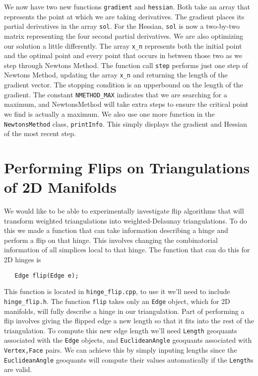 \documentclass{amsart}
\theoremstyle{plain}
\numberwithin{equation}{section}
\begin{document}
\bigskip

We now have two new functions \verb|gradient| and \verb|hessian|. Both take an array that represents the point at which we are taking derivatives. The gradient places its partial derivatives in the array \verb|sol|. For the Hessian, \verb|sol| is now a two-by-two matrix representing the four second partial derivatives. We are also optimizing our solution a little differently. The array \verb|x_n| represents both the initial point and the optimal point and every point that occurs in between those two as we step through Newtons Method. The function call \verb|step| performs just one step of Newtons Method, updating the array \verb|x_n| and returning the length of the gradient vector. The stopping condition is an upperbound on the length of the gradient. The constant \verb|NMETHOD_MAX| indicates that we are searching for a maximum, and NewtonsMethod will take extra steps to ensure the critical point we find is actually a maximum. We also use one more function in the \verb|NewtonsMethod| class, \verb|printInfo|. This simply displays the gradient and Hessian of the most recent step.\\

\section*{Performing Flips on Triangulations of 2D Manifolds}

We would like to be able to experimentally investigate flip algorithms that will transform weighted triangulations into weighted-Delaunay triangulations. To do this we made a function that can take information describing a hinge and perform a flip on that hinge. This involves changing the combinatorial information of all simplices local to that hinge. The function that can do this for 2D hinges is\\

\begin{verbatim}
   Edge flip(Edge e);
\end{verbatim}

\bigskip

This function is located in \verb|hinge_flip.cpp|, to use it we'll need to include \verb|hinge_flip.h|. The function \verb|flip| takes only an \verb|Edge| object, which for 2D manifolds, will fully describe a hinge in our triangulation. Part of performing a flip involves giving the flipped edge a new length so that it fits into the rest of the triangulation. To compute this new edge length we'll need \verb|Length| geoquants associated with the \verb|Edge| objects, and \verb|EuclideanAngle| geoquants associated with \verb|Vertex,Face| pairs. We can achieve this by simply inputing lengths since the \verb|EuclideanAngle| geoquants will compute their values automatically if the \verb|Length|s are valid.
\end{document}
